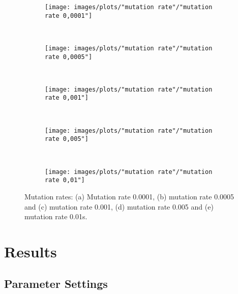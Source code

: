 \begin{figure}[h!]
    \centering
      \begin{subfigure}[b]{0.31\textwidth}
        \texttt{[image: images/plots/"mutation rate"/"mutation rate 0,0001"]}
        \caption{}
        \hfill
        \label{plot:mutation rate 0.0001}
    \end{subfigure}
    ~
      \begin{subfigure}[b]{0.31\textwidth}
        \texttt{[image: images/plots/"mutation rate"/"mutation rate 0,0005"]}
        \caption{}
        \hfill
        \label{plot:mutation rate 0.0005}
    \end{subfigure}
    ~
    \begin{subfigure}[b]{0.31\textwidth}
        \texttt{[image: images/plots/"mutation rate"/"mutation rate 0,001"]}
        \caption{}
        \hfill
        \label{plot:mutation rate 0.001}
    \end{subfigure}
    ~
    \begin{subfigure}[b]{0.31\textwidth}
        \texttt{[image: images/plots/"mutation rate"/"mutation rate 0,005"]}
        \caption{}
        \hfill
        \label{plot:mutation rate 0.005}
    \end{subfigure}
    ~
    \begin{subfigure}[b]{0.31\textwidth}
        \texttt{[image: images/plots/"mutation rate"/"mutation rate 0,01"]}
        \caption{}
        \hfill
        \label{plot:mutation rate 0.01}
    \end{subfigure}
    \caption{Mutation rates: (a) Mutation rate 0.0001, (b) mutation rate 0.0005 and (c) mutation rate 0.001, (d) mutation rate 0.005 and (e) mutation rate 0.01s.}
    \label{plot:mutation rate}
\end{figure}


\section{Results}\label{section:results}


\subsection{Parameter Settings}


